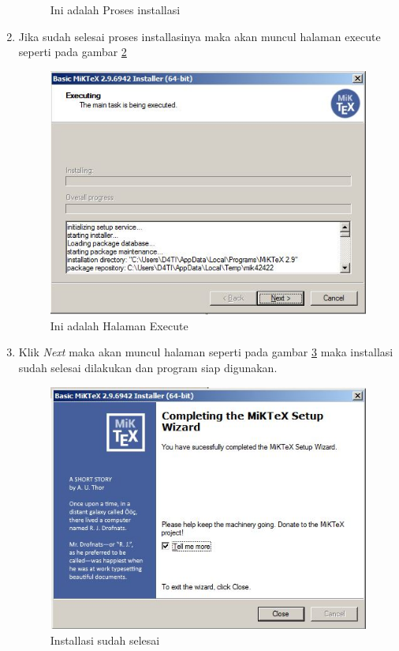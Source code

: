 \begin{enumerate}
\begin{figure}[!htbp]
  		 \caption{Ini adalah Proses installasi}\label{fig:proses}
		 \end{figure}
	\item Jika sudah selesai proses installasinya maka akan muncul halaman execute seperti pada gambar \ref{fig:ex}
		 \begin{figure}[!htbp]
  		 \centering
 		 \includegraphics[width=.75\textwidth]{figures/Miktex/ex.JPG}
  		 \caption{Ini adalah Halaman Execute}\label{fig:ex}
		 \end{figure}
	\item Klik \textit{Next} maka akan muncul halaman seperti pada gambar \ref{fig:done} maka installasi sudah selesai dilakukan dan program siap digunakan.
		 \begin{figure}[!htbp]
  		 \centering
 		 \includegraphics[width=.75\textwidth]{figures/Miktex/done.JPG}
  		 \caption{Installasi sudah selesai}\label{fig:done}
		 \end{figure}
\end{enumerate}

